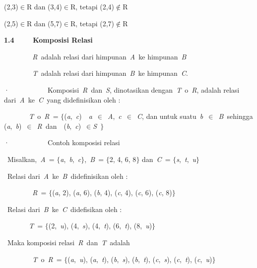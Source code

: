 \documentclass[11pt,fleqn]{book} %
\begin{document}
\noindent (2,3)$\mathrm{\in }$R dan (3,4)$\mathrm{\in }$R, tetapi (2,4)$\mathrm{\notin }$R

\noindent (2,5)$\mathrm{\in }$R dan (5,7)$\mathrm{\in }$R, tetapi (2,7)$\mathrm{\notin }$R

\noindent \textbf{1.4 ~~~~Komposisi Relasi}

\noindent 

\noindent \textit{~~~~~~~~R~}adalah relasi dari himpunan~\textit{A~}ke himpunan~\textit{B}

\noindent \textit{~~~~~~~~T~}adalah relasi dari himpunan~\textit{B~}ke himpunan~\textit{C}.

\noindent ·~~~~~~~~~~~Komposisi~\textit{R~}dan~\textit{S}, dinotasikan dengan~\textit{T~}$\mathrm{o}$~\textit{R}, adalah relasi dari~\textit{A~}ke~\textit{C~}yang didefinisikan oleh :

\noindent \textit{~~~~~~~T~}$\mathrm{o}$~\textit{R~}= $\{$(\textit{a},~\textit{c})~{\textbar}~\textit{a~}$\mathrm{\in }$~\textit{A},~\textit{c~}$\mathrm{\in }$~\textit{C}, dan untuk suatu~\textit{b~}$\mathrm{\in }$~\textit{B~}sehingga (\textit{a},~\textit{b})~$\mathrm{\in }$~\textit{R~}dan~~(\textit{b},~\textit{c})~$\mathrm{\in }$\textit{S~}$\}$

\noindent ·~~~~~~~~~~~Contoh komposisi relasi

\noindent {\O}~Misalkan,~\textit{A~}= $\{$\textit{a},~\textit{b},~\textit{c}$\}$,~\textit{B~}= $\{$2, 4, 6, 8$\}$ dan~\textit{C~}= $\{$\textit{s},~\textit{t},~\textit{u}$\}$

\noindent {\O}~Relasi dari~\textit{A~}ke~\textit{B~}didefinisikan oleh :

\noindent \textit{~~~~~~~~R~}= $\{$(\textit{a}, 2), (\textit{a}, 6), (\textit{b}, 4), (\textit{c}, 4), (\textit{c}, 6), (\textit{c}, 8)$\}$

\noindent {\O}~Relasi dari~\textit{B~}ke~\textit{C~}didefisikan oleh :

\noindent \textit{~~~~~~~T~}= $\{$(2,~\textit{u}), (4,~\textit{s}), (4,~\textit{t}), (6,~\textit{t}), (8,~\textit{u})$\}$

\noindent {\O}~Maka komposisi relasi~\textit{R~}dan~\textit{T~}adalah

\noindent \textit{~~~~~~~~T~}$\mathrm{o}$~\textit{R~}= $\{$(\textit{a},~\textit{u}), (\textit{a},~\textit{t}), (\textit{b},~\textit{s}), (\textit{b},~\textit{t}), (\textit{c},~\textit{s}), (\textit{c},~\textit{t}), (\textit{c},~\textit{u})$\}$

\noindent 
\end{document}
